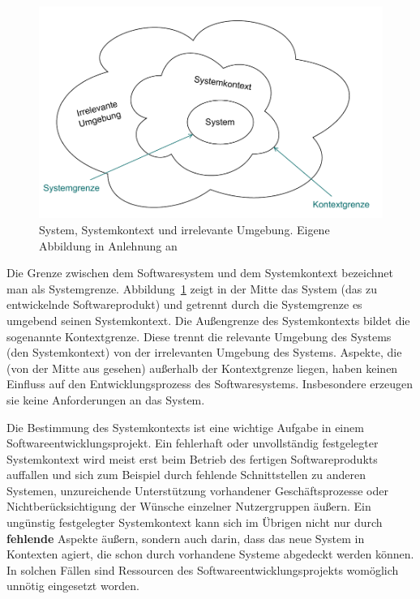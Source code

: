 \vspace{\baselineskip} %

\begin{figure}[h!]
	\centering
	\includegraphics[scale=0.75]{Bilder/Kapitel-6/system-system.pdf}
	\caption[System, Systemkontext und irrelevante Umgebung]{System, Systemkontext und irrelevante Umgebung. Eigene Abbildung in Anlehnung an \cite[15]{poh15}}
	\label{fig:system-system}
\end{figure}

\vspace{\baselineskip} %

Die Grenze zwischen dem Softwaresystem und dem Systemkontext bezeichnet man als Systemgrenze. Abbildung~\ref{fig:system-system} zeigt in der Mitte das System (das zu entwickelnde Softwareprodukt) und getrennt durch die Systemgrenze es umgebend seinen System\-kontext. Die Außengrenze des Systemkontexts bildet die sogenannte Kontextgrenze. Diese trennt die relevante Umgebung des Systems (den Systemkontext) von der irrelevanten Umgebung des Systems. Aspekte, die (von der Mitte aus gesehen) außerhalb der Kontextgrenze liegen, haben keinen Einfluss auf den Entwicklungsprozess des Softwaresystems. Insbesondere erzeugen sie keine Anforderungen an das System.

Die Bestimmung des Systemkontexts ist eine wichtige Aufgabe in einem Softwareentwicklungsprojekt. Ein fehlerhaft oder unvollständig festgelegter Systemkontext wird meist erst beim Betrieb des fertigen Softwareprodukts auffallen und sich zum Beispiel durch fehlende Schnittstellen zu anderen Systemen, unzureichende Unterstützung vorhandener Geschäftsprozesse oder Nichtberücksichtigung der Wünsche einzelner Nutzergruppen äußern. Ein ungünstig festgelegter Systemkontext kann sich im Übrigen nicht nur durch \textbf{fehlende} Aspekte äußern, sondern auch darin, dass das neue System in Kontexten agiert, die schon durch vorhandene Systeme abgedeckt werden können. In solchen Fällen sind Ressourcen des Softwareentwicklungsprojekts womöglich unnötig eingesetzt worden.


